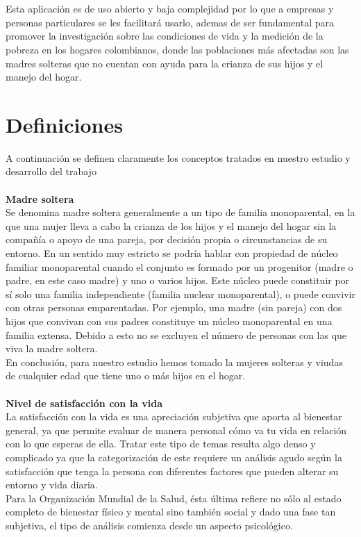 \documentclass[11pt,twoside]{article}
\begin{document}
\\
\\
Esta aplicación es de  uso abierto y  baja complejidad por lo que a empresas y personas particulares  se les facilitará usarlo, ademas de ser fundamental para promover la investigación sobre las condiciones de vida y la medición de la pobreza en los hogares colombianos, donde las poblaciones más afectadas son las madres solteras que no cuentan con ayuda para la crianza de sus hijos y el manejo del hogar.




\section{Definiciones}
\noindent
A continuación se definen claramente los conceptos tratados en nuestro estudio y desarrollo del trabajo \\
\\
\textbf{Madre soltera} \\
Se denomina madre soltera generalmente a un tipo de familia monoparental, en la que una mujer lleva a cabo la crianza de los hijos y el manejo del hogar sin la compañía o apoyo de una pareja, por decisión propia o circunstancias de su entorno. En un sentido muy estricto se podría hablar con propiedad de núcleo familiar monoparental cuando el conjunto es formado por un progenitor (madre o padre, en este caso madre) y uno o varios hijos. Este núcleo puede constituir por sí solo una familia independiente (familia nuclear monoparental), o puede convivir con otras personas emparentadas. Por ejemplo, una madre (sin pareja) con dos hijos que convivan con sus padres constituye un núcleo monoparental en una familia extensa. Debido a esto no se excluyen el número de personas con las que viva la madre soltera.\\
En conclusión, para nuestro estudio hemos tomado la mujeres solteras y viudas de cualquier edad que tiene uno o más hijos en el hogar.\\
\\
\textbf{Nivel de satisfacción con la vida}\\
La satisfacción con la vida es una apreciación subjetiva que aporta al bienestar general, ya que permite evaluar de manera personal cómo va tu vida en relación con lo que esperas de ella. Tratar este tipo de temas resulta algo denso y complicado ya que la categorización de este requiere un análisis agudo según la satisfacción que tenga la persona con diferentes factores que pueden alterar su entorno y vida diaria.\\
Para la Organización Mundial de la Salud, ésta última refiere no sólo al estado completo de bienestar físico y mental sino también social y dado una fase tan subjetiva, el tipo de análisis comienza desde un aspecto psicológico.
\end{document}
